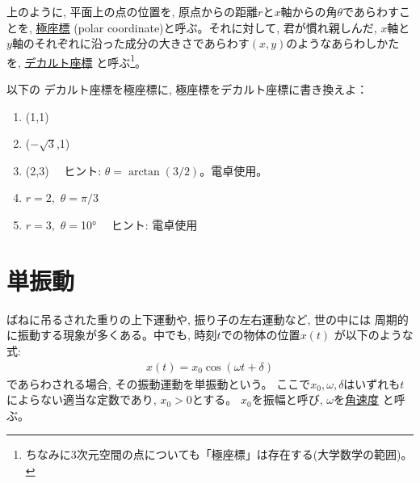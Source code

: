 上のように, 平面上の点の位置を, 原点からの距離$r$と$x$軸からの角$\theta$であらわすことを, 
\underline{極座標}  (polar coordinate)と呼ぶ。それに対して, 
君が慣れ親しんだ, $x$軸と$y$軸のそれぞれに沿った成分の大きさであらわす$(x, y)$のようなあらわしかたを, 
\underline{デカルト座標} 
と呼ぶ\footnote{ちなみに3次元空間の点についても「極座標」は存在する(大学数学の範囲)。}。

\begin{q}\label{q:trig_2Dpolar1} 以下の
デカルト座標を極座標に, 極座標をデカルト座標に書き換えよ：
\begin{enumerate}
\item (1,1)
\item ($-\sqrt{3}$,1)
\item (2,3) 　ヒント: $\theta=\arctan(3/2)$。電卓使用。
\item $r=2,\,\, \theta=\pi/3$
\item $r=3,\,\, \theta=$10° 　ヒント: 電卓使用
\end{enumerate}\end{q}
\mv


\section{単振動}

ばねに吊るされた重りの上下運動や, 振り子の左右運動など, 世の中には
周期的に振動する現象が多くある。中でも, 時刻$t$での物体の位置$x(t)$
が以下のような式:
\begin{eqnarray}
x(t)=x_0\cos(\omega t + \delta)\label{eq:trig_harmonic_oscilation}
\end{eqnarray}
であらわされる場合, その振動運動を単振動という。
ここで$x_0, \omega, \delta$はいずれも$t$によらない適当な定数であり, $x_0>0$とする。
$x_0$を振幅と呼び, $\omega$を\underline{角速度}
と呼ぶ。

